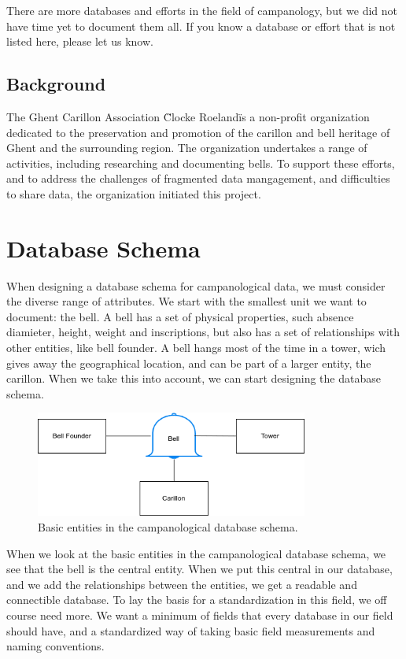 \documentclass[11pt, a4paper]{article}
\begin{document}
There are more databases and efforts in the field of campanology, but we did not have time yet to document them all. If you know a database or effort that is not listed here, please let us know.

\subsection{Background}

The Ghent Carillon Association \"Clocke Roeland\" is a non-profit organization dedicated to the preservation and promotion of the carillon and bell heritage of Ghent and the surrounding region. The organization undertakes a range of activities, including researching and documenting bells. To support these efforts, and to address the challenges of fragmented data mangagement, and difficulties to share data, the organization initiated this project.
    
\section{Database Schema}

When designing a database schema for campanological data, we must consider the diverse range of attributes. We start with the smallest unit we want to document: the bell. A bell has a set of physical properties, such absence diamieter, height, weight and inscriptions, but also has a set of relationships with other entities, like bell founder. A bell hangs most of the time in a tower, wich gives away the geographical location, and can be part of a larger entity, the carillon. When we take this into account, we can start designing the database schema.

\begin{figure}[h!]
    \centering
    \includegraphics[width=0.8\textwidth]{images/basic_entities.png}
    \caption{Basic entities in the campanological database schema.}
    \label{fig:basic-entities}
\end{figure}

When we look at the basic entities in the campanological database schema, we see that the bell is the central entity. When we put this central in our database, and we add the relationships between the entities, we get a readable and 
connectible database. To lay the basis for a standardization in this field, we off course need more. We want a minimum of fields that every database in our field should have, and a standardized way of taking basic field measurements and naming conventions.
\end{document}

